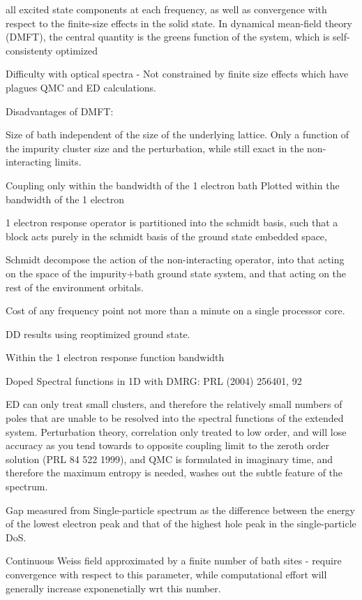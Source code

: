 \documentclass[aps,showpacs,twocolumn,nobibnotes]{revtex4}
\begin{document}
all excited state components at each frequency, as well as 
convergence with respect to the finite-size effects in the solid state. In dynamical mean-field theory (DMFT), the central quantity 
is the greens function of the system, which is self-consistenty optimized 

Difficulty with optical spectra - 
Not constrained by finite size effects which have plagues QMC and ED calculations.

Disadvantages of DMFT:

Size of bath independent of the size of the underlying lattice. Only a function of the impurity cluster size and the perturbation, while still exact in the non-interacting limits.

Coupling only within the bandwidth of the 1 electron bath
Plotted within the bandwidth of the 1 electron 

1 electron response operator is partitioned into the schmidt basis, such that a block acts purely in the schmidt basis of the ground state embedded space, 

Schmidt decompose the action of the non-interacting operator, into that acting on the space of the impurity+bath ground state system, and that acting on the rest of the environment orbitals.

Cost of any frequency point not more than a minute on a single processor core.

DD results using reoptimized ground state.

Within the 1 electron response function bandwidth

Doped Spectral functions in 1D with DMRG: PRL (2004) 256401, 92

ED can only treat small clusters, and therefore the relatively small numbers of poles that are unable to be resolved into the spectral functions of the extended system. Perturbation theory, 
correlation only treated to low order, and will 
lose accuracy as you tend towards to opposite coupling limit to the zeroth order solution (PRL 84 522 1999), and QMC is formulated in imaginary time, and therefore the maximum entropy is needed,
washes out the subtle feature of the spectrum.


Gap measured from Single-particle spectrum as the difference between the energy of the lowest electron peak and that of the highest hole peak in the single-particle DoS.

Continuous Weiss field approximated by a finite number of bath sites - require convergence with respect to this parameter, while computational effort will generally increase exponenetially wrt this number.
\end{document}
